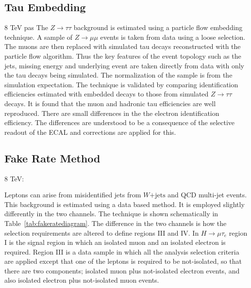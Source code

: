 \documentclass[oneside, letterpaper, oldfontcommands]{memoir}
\begin{document}
{{{\subsection{Tau Embedding}
8 TeV pas
The  $Z \rightarrow \tau \tau$  background is estimated using a particle flow embedding technique.
A sample of $Z \rightarrow \mu \mu$ events is taken from data using a loose selection. The muons are then replaced
with simulated tau decays reconstructed with the particle flow algorithm. Thus the key features of the event topology such as the
jets, missing energy and underlying event are taken directly from data with only the tau decays being simulated. The normalization
of the sample is from the simulation expectation. The technique is validated by comparing identification efficiencies
estimated with embedded decays to those from  simulated $Z \rightarrow \tau \tau$ decays. It is found that the muon and hadronic
tau efficiencies are well reproduced. There are small differences in the the electron identification efficiency.
 The differences are
understood to be a consequence of
the selective readout of the ECAL and corrections are applied for this.
\subsection{Fake Rate Method}
8 TeV:


Leptons can arise from misidentified jets  from $W\mathrm{+jets}$ and QCD multi-jet events. This background is estimated using a data based method.
It is employed slightly differently in the
two channels. The technique is shown schematically in Table~\ref{tab:fakeratediagram}.
The difference in the two channels is how the selection requirements are altered to define regions III and IV.
In $H \rightarrow \mu \tau_{e}$ region I is the signal region in which an isolated muon and an isolated electron is required.
Region III is a data sample in which all the analysis selection criteria are applied except that
one of the leptons is required to be not-isolated, so that there are two components;  isolated muon plus not-isolated
electron events, and also isolated electron plus not-isolated muon events.

}}}
\end{document}
